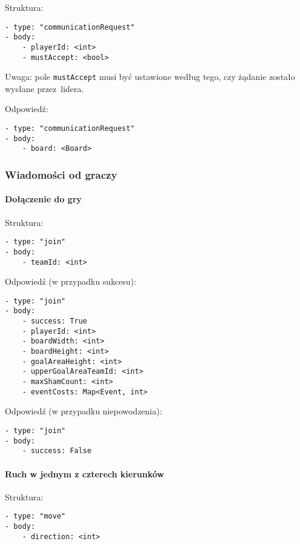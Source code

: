 \documentclass[a4paper]{article}
\newcommand{\code}{\texttt}
\begin{document}
Struktura:

\begin{verbatim}
- type: "communicationRequest"
- body:
    - playerId: <int>
    - mustAccept: <bool>
\end{verbatim}

Uwaga: pole \code{mustAccept} musi być ustawione według tego, czy żądanie zostało wysłane przez~lidera.

Odpowiedź:

\begin{verbatim}
- type: "communicationRequest"
- body:
    - board: <Board>
\end{verbatim}

\subsubsection{Wiadomości od graczy}

\paragraph{Dołączenie do gry}
\hfill

Struktura:

\begin{verbatim}
- type: "join"
- body:
    - teamId: <int>
\end{verbatim}

Odpowiedź (w przypadku sukcesu):

\begin{verbatim}
- type: "join"
- body:
    - success: True
    - playerId: <int>
    - boardWidth: <int>
    - boardHeight: <int>
    - goalAreaHeight: <int>
    - upperGoalAreaTeamId: <int>
    - maxShamCount: <int>
    - eventCosts: Map<Event, int>
\end{verbatim}

Odpowiedź (w przypadku niepowodzenia):

\begin{verbatim}
- type: "join"
- body:
    - success: False
\end{verbatim}

\paragraph{Ruch w jednym z czterech kierunków}
\hfill

Struktura:

\begin{verbatim}
- type: "move"
- body:
    - direction: <int>
\end{verbatim}
\end{document}
